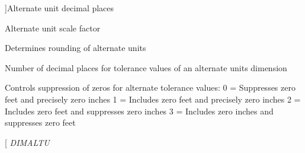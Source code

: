 \begin{Desc}
\begin{description}
{}]Alternate unit decimal places \item[{\em 
D\+I\+M\+A\+L\+TF\hypertarget{class_c_a_d_header_abd894aab7aa85b4c4634e67fb93d6886aa3ea717e4f3efb9b31c2e133e235b790}{}\label{class_c_a_d_header_abd894aab7aa85b4c4634e67fb93d6886aa3ea717e4f3efb9b31c2e133e235b790}
}]Alternate unit scale factor \item[{\em 
D\+I\+M\+A\+L\+T\+R\+ND\hypertarget{class_c_a_d_header_abd894aab7aa85b4c4634e67fb93d6886a7f3fc9dbba0b8d985c9ac415e0d34e9a}{}\label{class_c_a_d_header_abd894aab7aa85b4c4634e67fb93d6886a7f3fc9dbba0b8d985c9ac415e0d34e9a}
}]Determines rounding of alternate units \item[{\em 
D\+I\+M\+A\+L\+T\+TD\hypertarget{class_c_a_d_header_abd894aab7aa85b4c4634e67fb93d6886a57f8b6dadd0218acd4a4d1137a7dae9a}{}\label{class_c_a_d_header_abd894aab7aa85b4c4634e67fb93d6886a57f8b6dadd0218acd4a4d1137a7dae9a}
}]Number of decimal places for tolerance values of an alternate units dimension \item[{\em 
D\+I\+M\+A\+L\+T\+TZ\hypertarget{class_c_a_d_header_abd894aab7aa85b4c4634e67fb93d6886a8a3517d84a3b6ef6e0c3fc16746f4eae}{}\label{class_c_a_d_header_abd894aab7aa85b4c4634e67fb93d6886a8a3517d84a3b6ef6e0c3fc16746f4eae}
}]Controls suppression of zeros for alternate tolerance values\+: 0 = Suppresses zero feet and precisely zero inches 1 = Includes zero feet and precisely zero inches 2 = Includes zero feet and suppresses zero inches 3 = Includes zero inches and suppresses zero feet \item[{\em 
D\+I\+M\+A\+L\+TU\hypertarget{class_c_a_d_header_abd894aab7aa85b4c4634e67fb93d6886a676bbba20b2092ea6d0abc231dc31b2d}{}\label{class_c_a_d_header_abd894aab7aa85b4c4634e67fb93d6886a676bbba20b2092ea6d0abc231dc31b2d}
}
\end{description}
\end{Desc}
